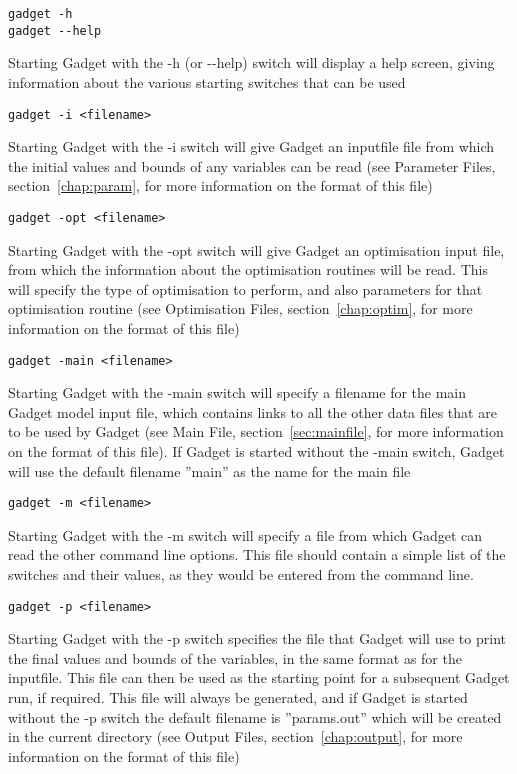 \documentclass [a4paper, 10pt]{book}
\begin{document}
{\small\begin{verbatim}
gadget -h
gadget --help
\end{verbatim}}
Starting Gadget with the -h (or -\hspace{0pt}-help) switch will display a help screen, giving information about the various starting switches that can be used

{\small\begin{verbatim}
gadget -i <filename>
\end{verbatim}}
Starting Gadget with the -i switch will give Gadget an inputfile file from which the initial values and bounds of any variables can be read (see Parameter Files, section~\ref{chap:param}, for more information on the format of this file)

{\small\begin{verbatim}
gadget -opt <filename>
\end{verbatim}}
Starting Gadget with the -opt switch will give Gadget an optimisation input file, from which the information about the optimisation routines will be read.  This will specify the type of optimisation to perform, and also parameters for that optimisation routine (see Optimisation Files, section~\ref{chap:optim}, for more information on the format of this file)

{\small\begin{verbatim}
gadget -main <filename>
\end{verbatim}}
Starting Gadget with the -main switch will specify a filename for the main Gadget model input file, which contains links to all the other data files that are to be used by Gadget (see Main File, section~\ref{sec:mainfile}, for more information on the format of this file).  If Gadget is started without the -main switch, Gadget will use the default filename ''main'' as the name for the main file

{\small\begin{verbatim}
gadget -m <filename>
\end{verbatim}}
Starting Gadget with the -m switch will specify a file from which Gadget can read the other command line options.  This file should contain a simple list of the switches and their values, as they would be entered from the command line.

{\small\begin{verbatim}
gadget -p <filename>
\end{verbatim}}
Starting Gadget with the -p switch specifies the file that Gadget will use to print the final values and bounds of the variables, in the same format as for the inputfile.  This file can then be used as the starting point for a subsequent Gadget run, if required.  This file will always be generated, and if Gadget is started without the -p switch the default filename is ''params.out'' which will be created in the current directory (see Output Files, section~\ref{chap:output}, for more information on the format of this file)
\end{document}
